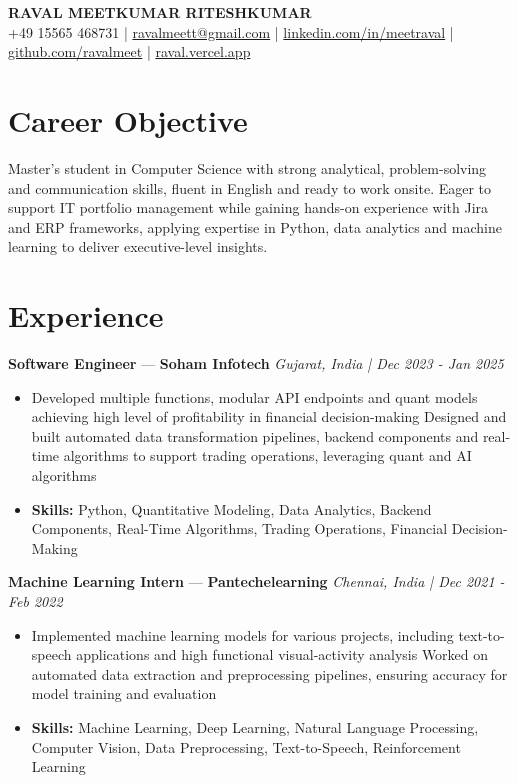 \documentclass[a4paper,10pt]{article}
\begin{document}
\begin{center}
  {\Large\bfseries RAVAL MEETKUMAR RITESHKUMAR}\\[2pt]
  {\small +49 15565 468731 \;|\; \href{mailto:ravalmeett@gmail.com}{ravalmeett@gmail.com} \;|\; \href{https://www.linkedin.com/in/meetraval/}{linkedin.com/in/meetraval} \;|\; \href{https://github.com/ravalmeet}{github.com/ravalmeet} \;|\; \href{https://raval.vercel.app/}{raval.vercel.app}}
\end{center}
\vspace{-3pt}

\section*{Career Objective}
Master's student in Computer Science with strong analytical, problem-solving and communication skills, fluent in English and ready to work onsite. Eager to support IT portfolio management while gaining hands-on experience with Jira and ERP frameworks, applying expertise in Python, data analytics and machine learning to deliver executive-level insights.\par

\section*{Experience}
\textbf{Software Engineer} — \textbf{Soham Infotech} \hfill \textit{Gujarat, India \;|\; Dec 2023 - Jan 2025}\par
\vspace{1pt}
\begin{itemize}
  \item Developed multiple functions, modular API endpoints and quant models achieving high level of profitability in financial decision-making Designed and built automated data transformation pipelines, backend components and real-time algorithms to support trading operations, leveraging quant and AI algorithms
  \item \textbf{Skills:} Python, Quantitative Modeling, Data Analytics, Backend Components, Real-Time Algorithms, Trading Operations, Financial Decision-Making
\end{itemize}
\vspace{3pt}
\textbf{Machine Learning Intern} — \textbf{Pantechelearning} \hfill \textit{Chennai, India \;|\; Dec 2021 - Feb 2022}\par
\vspace{1pt}
\begin{itemize}
  \item Implemented machine learning models for various projects, including text-to-speech applications and high functional visual-activity analysis Worked on automated data extraction and preprocessing pipelines, ensuring accuracy for model training and evaluation
  \item \textbf{Skills:} Machine Learning, Deep Learning, Natural Language Processing, Computer Vision, Data Preprocessing, Text-to-Speech, Reinforcement Learning
\end{itemize}
\end{document}
